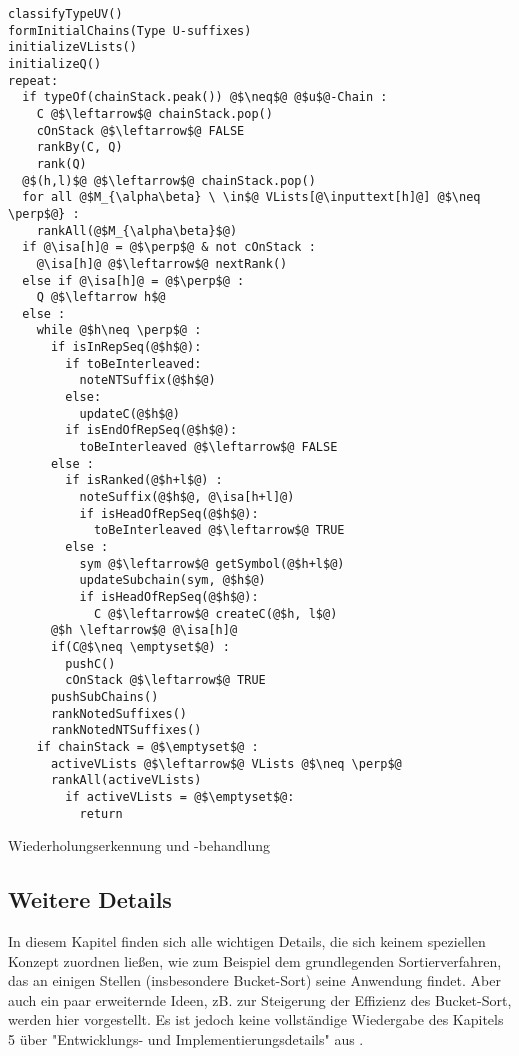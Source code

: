 \begin{listing}[htp]
\begin{verbatim}
classifyTypeUV()
formInitialChains(Type U-suffixes)
initializeVLists()
initializeQ()
repeat:
  if typeOf(chainStack.peak()) @$\neq$@ @$u$@-Chain :
    C @$\leftarrow$@ chainStack.pop()
    cOnStack @$\leftarrow$@ FALSE
    rankBy(C, Q)
    rank(Q) 
  @$(h,l)$@ @$\leftarrow$@ chainStack.pop()	
  for all @$M_{\alpha\beta} \ \in$@ VLists[@\inputtext[h]@] @$\neq \perp$@} :
    rankAll(@$M_{\alpha\beta}$@)  
  if @\isa[h]@ = @$\perp$@ & not cOnStack :
    @\isa[h]@ @$\leftarrow$@ nextRank()	
  else if @\isa[h]@ = @$\perp$@ :
    Q @$\leftarrow h$@	
  else :
    while @$h\neq \perp$@ :   
      if isInRepSeq(@$h$@):
        if toBeInterleaved:
          noteNTSuffix(@$h$@)
        else:
          updateC(@$h$@)          
        if isEndOfRepSeq(@$h$@):
          toBeInterleaved @$\leftarrow$@ FALSE      
      else :
        if isRanked(@$h+l$@) :
          noteSuffix(@$h$@, @\isa[h+l]@)
          if isHeadOfRepSeq(@$h$@):
            toBeInterleaved @$\leftarrow$@ TRUE       
        else :
          sym @$\leftarrow$@ getSymbol(@$h+l$@)
          updateSubchain(sym, @$h$@)
          if isHeadOfRepSeq(@$h$@):
            C @$\leftarrow$@ createC(@$h, l$@)
      @$h \leftarrow$@ @\isa[h]@	
	  if(C@$\neq \emptyset$@) :
	    pushC()
	    cOnStack @$\leftarrow$@ TRUE	    
      pushSubChains()	
      rankNotedSuffixes()
      rankNotedNTSuffixes()   	
    if chainStack = @$\emptyset$@ :
      activeVLists @$\leftarrow$@ VLists @$\neq \perp$@
      rankAll(activeVLists)
        if activeVLists = @$\emptyset$@:
          return
\end{verbatim}
\caption{Wiederholungserkennung und -behandlung}
\label{wiedSeq}
\end{listing}


\subsection{Weitere Details} \label{Details}

In diesem Kapitel finden sich alle wichtigen Details, die sich keinem speziellen Konzept zuordnen ließen, wie zum Beispiel dem grundlegenden Sortierverfahren, das an einigen Stellen (insbesondere Bucket-Sort) seine Anwendung findet. Aber auch ein paar erweiternde Ideen, zB. zur Steigerung der Effizienz des Bucket-Sort, werden hier vorgestellt.
Es ist jedoch keine vollständige Wiedergabe des Kapitels 5 über "Entwicklungs- und Implementierungsdetails" aus \cite{Maniscalco}.


